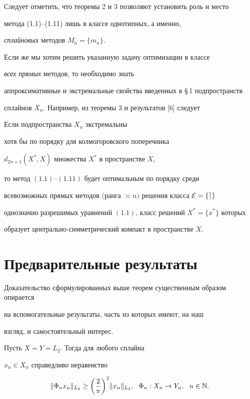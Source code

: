 Следует отметить, что теоремы 2 и 3 позволяют установить роль и место


метода (1.1)--(1.11) лишь в классе однотипных, а именно,


{\it сплайновых} методов $M_n=\{m_n\}$.


Если же мы хотим решить указанную задачу оптимизации в классе


{\it всех прямых} методов, то необходимо знать


аппроксимативные и экстремальные свойства введенных в \S\,1 подпространств


сплайнов $X_n$. Например, из теоремы 3 и результатов [6] следует





\begin{thm}


Если подпространства $X_n$ экстремальны 


хотя бы по порядку для колмогоровского поперечника


$d_{2n+1}(X^*,X)$ множества $X^*$ в пространстве $X$,


то метод $(1.1)$--$(1.11)$ будет оптимальным по порядку среди 


всевозможных прямых методов $($ранга $\asymp


n)$ решения класса $\rE=\{e\}$


однозначно разрешимых уравнений $(1.1)$, класс решений $X^*=\{x^*\}$ которых


образует центрально-симметрический компакт в пространстве $X$.


\end{thm}





\section{Предварительные результаты}





Доказательство сформулированных выше теорем существенным образом опирается


на вспомогательные результаты, часть из которых имеют, на наш


взгляд, и самостоятельный интерес.





\begin{lem}


Пусть $X=Y=L_2$. Тогда для любого сплайна


$x_n \in X_n$ справедливо неравенство


\begin{equation}


\| \Phi_n x_n\|_{L_2} \ge \bigg(


\frac{2}{\pi}\bigg)^2 \|x_n\|_{L_2},\ \  \Phi_n:X_n\to Y_n,


\ \ n \in \N.


\end{equation}


\end{lem}





